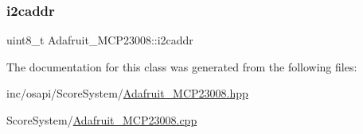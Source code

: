 \mbox{\label{class_adafruit___m_c_p23008_aacd0fda7bfc9d93442828123d0394d6b}} 
\subsubsection{\texorpdfstring{i2caddr}{i2caddr}}
{\footnotesize\ttfamily uint8\+\_\+t Adafruit\+\_\+\+M\+C\+P23008\+::i2caddr\hspace{0.3cm}{\ttfamily [private]}}



The documentation for this class was generated from the following files\+:\begin{DoxyCompactItemize}
\item 
inc/osapi/\+Score\+System/\hyperlink{_adafruit___m_c_p23008_8hpp}{Adafruit\+\_\+\+M\+C\+P23008.\+hpp}\item 
Score\+System/\hyperlink{_adafruit___m_c_p23008_8cpp}{Adafruit\+\_\+\+M\+C\+P23008.\+cpp}\end{DoxyCompactItemize}
